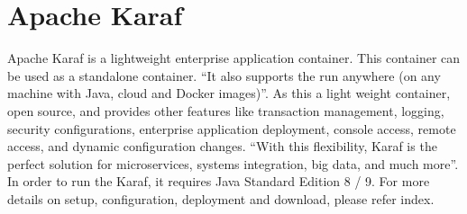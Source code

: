\section{Apache Karaf}

Apache Karaf is a lightweight enterprise application container. This
container can be used as a standalone container.  ``It also supports
the run anywhere (on any machine with Java, cloud and Docker
images)''\cite{hid-sp18-514-apachekaraf}.  As this a light weight
container, open source, and provides other features like transaction
management\cite{karaf_transaction}, logging, security configurations,
enterprise application deployment, console access, remote access, and
dynamic configuration changes. “With this flexibility, Karaf is the
perfect solution for microservices, systems integration, big data, and
much more”\cite{hid-sp18-514-apachekaraf}.  In order to run the Karaf,
it requires Java Standard Edition 8 / 9. For more details on setup,
configuration, deployment and download, please refer index.



